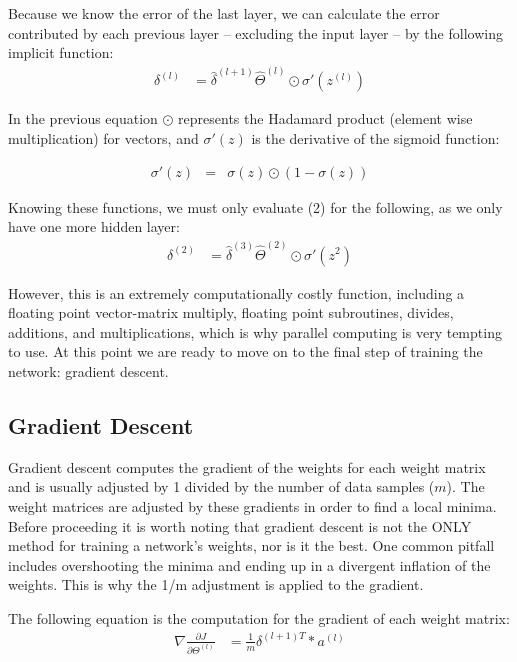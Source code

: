 \documentclass[11pt]{article}
\begin{document}
Because we know the error of the last layer, we can calculate the error contributed by each previous layer -- excluding the input layer -- by the following implicit function:
\begin{align}
	\delta^{(l)} & = \widehat{\delta}^{(l+1)}\widehat{\Theta}^{(l)} \odot \sigma'(z^{(l)}) 
\end{align}

In the previous equation $\odot$ represents the Hadamard product (element wise multiplication) for vectors, and $\sigma'(z)$ is the derivative of the sigmoid function:

\begin{align}
	\sigma'(z) & = & \sigma(z) \odot (1 - \sigma(z)) 
\end{align}

Knowing these functions, we must only evaluate (2) for the following, as we only have one more hidden layer:
\begin{align*}
	\delta^{(2)} & = \widehat{\delta}^{(3)}\widehat{\Theta}^{(2)} \odot \sigma'(z^2) 
\end{align*}

However, this is an extremely computationally costly function, including a floating point vector-matrix multiply, floating point subroutines, divides, additions, and multiplications, which is why parallel computing is very tempting to use. At this point we are ready to move on to the final step of training the network: gradient descent.

\subsection{Gradient Descent}
Gradient descent computes the gradient of the weights for each weight matrix and is usually adjusted by 1 divided by the number of data samples ($m$). The weight matrices are adjusted by these gradients in order to find a local minima. Before proceeding it is worth noting that gradient descent is not the ONLY method for training a network's weights, nor is it the best. One common pitfall includes overshooting the minima and ending up in a divergent inflation of the weights. This is why the 1/m adjustment is applied to the gradient.

The following equation is the computation for the gradient of each weight matrix:
\begin{align}
	\nabla\frac{\partial J}{\partial\Theta^{(l)}} & = \frac{1}{m} \delta^{(l+1)T}*a^{(l)} 
\end{align}
\end{document}
